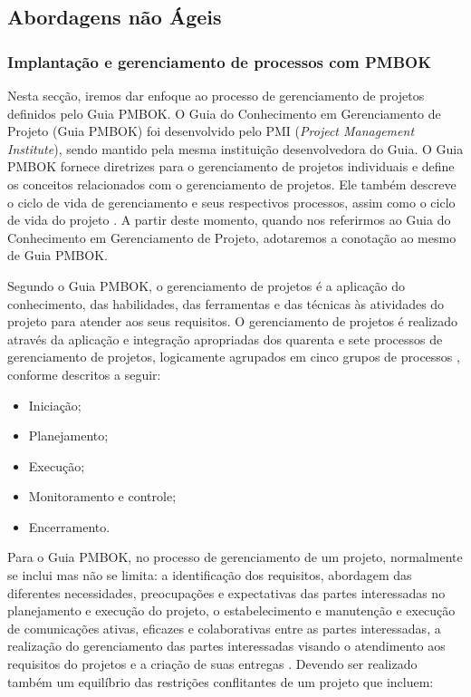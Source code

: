 \documentclass{acm_proc_article-sp}
\begin{document}
\subsection{Abordagens não Ágeis}
\subsubsection{Implantação e gerenciamento de processos com PMBOK}
Nesta secção, iremos dar enfoque ao processo de gerenciamento de projetos definidos pelo Guia PMBOK. O Guia do Conhecimento em Gerenciamento de Projeto (Guia PMBOK) foi desenvolvido pelo PMI (\textit{Project Management Institute}), sendo mantido pela mesma instituição desenvolvedora do Guia. O Guia PMBOK fornece diretrizes para o gerenciamento de projetos individuais e define os conceitos relacionados com o gerenciamento de projetos. Ele também descreve o ciclo de vida de gerenciamento e seus respectivos processos, assim como o ciclo de vida do projeto \cite{pmbok:nAgil}. A partir deste momento, quando nos referirmos ao Guia do Conhecimento em Gerenciamento de Projeto, adotaremos a conotação ao mesmo de Guia PMBOK.

Segundo o Guia PMBOK, o gerenciamento de projetos é a aplicação do conhecimento, das habilidades, das ferramentas e das técnicas às atividades do projeto para atender aos seus requisitos. O gerenciamento de projetos é realizado através da aplicação e integração apropriadas dos quarenta e sete processos de gerenciamento de projetos, logicamente agrupados em cinco grupos de processos \cite{pmbok:nAgil}, conforme descritos a seguir:

\begin{itemize}
\item Iniciação;
\item Planejamento;
\item Execução;
\item Monitoramento e controle;
\item Encerramento.
\end{itemize}

Para o Guia PMBOK, no processo de gerenciamento de um projeto, normalmente se inclui mas não se limita: a identificação dos requisitos, abordagem das diferentes necessidades, preocupações e expectativas das partes interessadas no planejamento e execução do projeto, o estabelecimento e manutenção e execução de comunicações ativas, eficazes e colaborativas entre as partes interessadas, a realização do gerenciamento das partes interessadas visando o atendimento aos requisitos do projetos e a criação de suas entregas \cite{pmbok:nAgil}. Devendo ser realizado também um equilíbrio das restrições conflitantes de um projeto que incluem:
\end{document}
